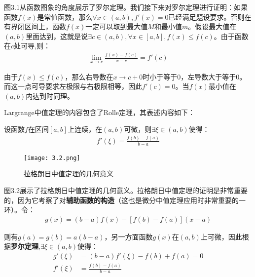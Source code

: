 \documentclass{ctexart}
\let\oldtextbf\textbf %
\renewcommand{\textbf}[1]{\textcolor{btex}{\oldtextbf{#1}}} %
\begin{document}
图3.1从函数图象的角度展示了罗尔定理。我们接下来对罗尔定理进行证明：如果函数$f(x)$是常值函数，那么$\forall x\in(a,b),f'(x)=0$已经满足题设要求。否则在有界闭区间上，函数$f(x)$一定可以取到最大值$M$和最小值$m$。假设最大值在$(a,b)$里面达到，这就是说$\exists c\in (a,b),\forall x\in[a,b],f(x)\leq f(c)$。由于函数在$c$处可导,则：
\begin{align*}
    \lim_{x\to c}\frac{f(x)-f(c)}{x-c}=f'(c)
\end{align*}

由于$f(x)\leq f(c)$，那么右导数在$x\to c+0$时小于等于0，左导数大于等于0。而这一点可导要求左极限与右极限相等，因此$f'(c)=0$。当$f(x)$最小值在$(a,b)$内达到时同理。

Largrange中值定理的内容包含了Rolle定理，其表述内容如下：
\begin{tcolorbox}[
    colback=bac1,     %
    colframe=fra1,   %
    coltitle=white,             %
    coltext=tex1,
    title=Largrange拉格朗日中值定理,
    fonttitle=\bfseries,        %
arc=3mm,                     %
breakable
]
设函数$f$在区间$[a,b]$上连续，在$(a,b)$可微，则$\exists \xi\in(a,b)$使得：
\begin{align*}
    f'(\xi)=\frac{f(b)-f(a)}{b-a}\tag{3-1}
\end{align*}
\end{tcolorbox}
\begin{figure}[H]    
\centering     
\renewcommand{\figurename}{图}     
\renewcommand{\thefigure}{3.2}    
\begin{myimagebox}[width=0.44\textwidth] %
\texttt{[image: 3.2.png]} %
\end{myimagebox}     
\caption{\label{fig:3.2}拉格朗日中值定理的几何意义}   
\end{figure}

图3.2展示了拉格朗日中值定理的几何意义。拉格朗日中值定理的证明是非常重要的，因为它考察了对\textbf{辅助函数的构造}（这也是微分中值定理应用时非常重要的一环）。令：
\begin{align*}
    g(x)=(b-a)f(x)-[f(b)-f(a)](x-a)
\end{align*}

则有$g(a)=g(b)=a(b-a)$，另一方面函数$g(x)$在$(a,b)$上可微，因此根据\textbf{罗尔定理},$\exists \xi \in(a,b)$使得：
\begin{align*}
    g'(\xi)&=(b-a)f'(\xi)-f(b)+f(a)=0\\
    f'(\xi)&=\frac{f(b)-f(a)}{b-a}
\end{align*}
\end{document}

